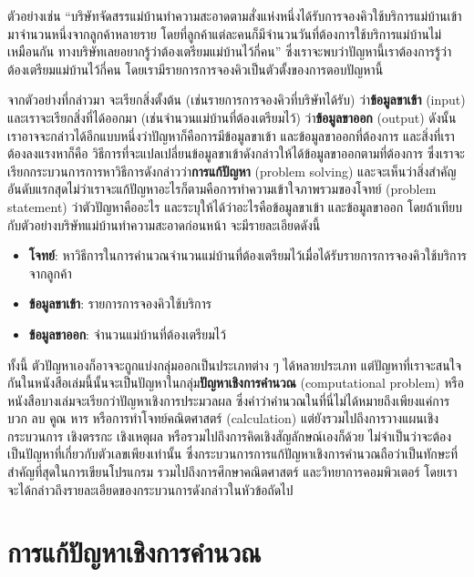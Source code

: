 ตัวอย่างเช่น ``บริษัทจัดสรรแม่บ้านทำความสะอาดตามสั่งแห่งหนึ่งได้รับการจองคิวใช้บริการแม่บ้านเข้ามาจำนวนหนึ่งจากลูกค้าหลายราย โดยที่ลูกค้าแต่ละคนก็มีจำนวนวันที่ต้องการใช้บริการแม่บ้านไม่เหมือนกัน ทางบริษัทเลยอยากรู้ว่าต้องเตรียมแม่บ้านไว้กี่คน'' ซึ่งเราจะพบว่าปัญหานี้เราต้องการรู้ว่าต้องเตรียมแม่บ้านไว้กี่คน โดยเรามีรายการการจองคิวเป็นตัวตั้งของการตอบปัญหานี้

จากตัวอย่างที่กล่าวมา จะเรียกสิ่งตั้งต้น (เช่นรายการการจองคิวที่บริษัทได้รับ) ว่า\textbf{ข้อมูลขาเข้า} (input) และเราจะเรียกสิ่งที่ได้ออกมา (เช่นจำนวนแม่บ้านที่ต้องเตรียมไว้) ว่า\textbf{ข้อมูลขาออก} (output) ดังนั้น เราอาจจะกล่าวได้อีกแบบหนึ่งว่าปัญหาก็คือการมีข้อมูลขาเข้า และข้อมูลขาออกที่ต้องการ และสิ่งที่เราต้องลงแรงหาก็คือ วิธีการที่จะแปลเปลี่ยนข้อมูลขาเข้าดังกล่าวให้ได้ข้อมูลขาออกตามที่ต้องการ ซึ่งเราจะเรียกกระบวนการการหาวิธีการดังกล่าวว่า\textbf{การแก้ปัญหา} (problem solving) และจะเห็นว่าสิ่งสำคัญอันดับแรกสุดไม่ว่าเราจะแก้ปัญหาอะไรก็ตามคือการทำความเข้าใจภาพรวมของโจทย์ (problem statement) ว่าตัวปัญหาคืออะไร และระบุให้ได้ว่าอะไรคือข้อมูลขาเข้า และข้อมูลขาออก โดยถ้าเทียบกับตัวอย่างบริษัทแม่บ้านทำความสะอาดก่อนหน้า จะมีรายละเอียดดังนี้

\begin{itemize}
	\itemsep0em 
	\item \textbf{โจทย์}: หาวิธีการในการคำนวณจำนวนแม่บ้านที่ต้องเตรียมไว้เมื่อได้รับรายการการจองคิวใช้บริการจากลูกค้า
	\item \textbf{ข้อมูลขาเข้า}: รายการการจองคิวใช้บริการ
	\item \textbf{ข้อมูลขาออก}: จำนวนแม่บ้านที่ต้องเตรียมไว้
\end{itemize}

ทั้งนี้ ตัวปัญหาเองก็อาจจะถูกแบ่งกลุ่มออกเป็นประเภทต่าง ๆ ได้หลายประเภท แต่ปัญหาที่เราจะสนใจกันในหนังสือเล่มนี้นั้นจะเป็นปัญหาในกลุ่ม\textbf{ปัญหาเชิงการคำนวณ} (computational problem) หรือหนังสือบางเล่มจะเรียกว่าปัญหาเชิงการประมวลผล ซึ่งคำว่าคำนวณในที่นี่ไม่ได้หมายถึงเพียงแค่การบวก ลบ คูณ หาร หรือการทำโจทย์คณิตศาสตร์ (calculation) แต่ยังรวมไปถึงการวางแผนเชิงกระบวนการ เชิงตรรกะ เชิงเหตุผล หรือรวมไปถึงการคิดเชิงสัญลักษณ์เองก็ด้วย ไม่จำเป็นว่าจะต้องเป็นปัญหาที่เกี่ยวกับตัวเลขเพียงเท่านั้น ซึ่งกระบวนการการแก้ปัญหาเชิงการคำนวณถือว่าเป็นทักษะที่สำคัญที่สุดในการเขียนโปรแกรม รวมไปถึงการศึกษาคณิตศาสตร์ และวิทยาการคอมพิวเตอร์ โดยเราจะได้กล่าวถึงรายละเอียดของกระบวนการดังกล่าวในหัวข้อถัดไป

\section{การแก้ปัญหาเชิงการคำนวณ}

